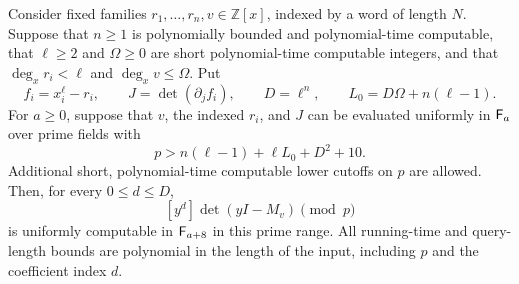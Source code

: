 \begin{proposition}
\label{prop:char-coeff}
Consider fixed families $r_1,\ldots,r_n,v\in\mathbb Z[x]$, indexed
by a word of length $N$.  Suppose that $n\ge1$ is polynomially bounded
and polynomial-time computable, that $\ell\ge2$ and $\Omega\ge0$
are short polynomial-time computable integers, and that
$\deg_x r_i<\ell$ and $\deg_x v\le\Omega$.  Put
\[
 f_i=x_i^\ell-r_i,\qquad
 J=\det(\partial_jf_i),\qquad
 D=\ell^n,\qquad L_0=D\Omega+n(\ell-1).
\]
For $a\ge0$, suppose that $v$, the indexed $r_i$, and $J$ can be
evaluated uniformly in $\mathsf F_{a}$ over prime fields with
\begin{equation}\label{eq:char-prime-bound}
 p>n(\ell-1)+\ell L_0+D^2+10.
\end{equation}
Additional short, polynomial-time computable lower cutoffs on $p$
are allowed.  Then, for every $0\le d\le D$,
\[
 [y^d]\det(yI-M_v)\pmod p
\]
is uniformly computable in $\mathsf F_{a+8}$ in this prime range.
All running-time and query-length bounds are polynomial in the
length of the input, including $p$ and the coefficient index $d$.
\end{proposition}

